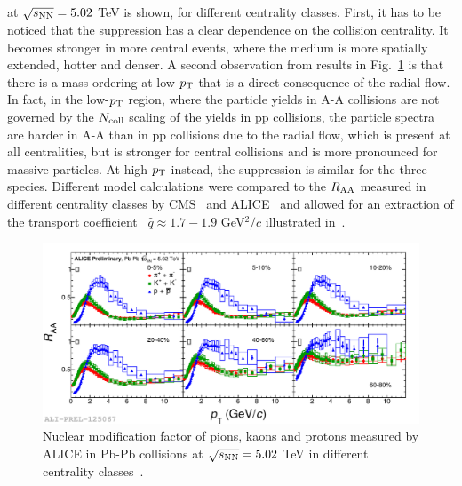  at $\sqrt{s_{\rm NN}} = 5.02$ TeV is shown, for different centrality classes. First, it 
 has to be noticed that the suppression has a clear dependence on the 
 collision centrality. It becomes stronger in more central events, 
 where the medium is more spatially extended, hotter and denser. 
 A second observation from 
  results in Fig.~\ref{fig:PiKPRaa5TeV} is that there is a mass ordering at 
  low $p_{\rm T}$ that is a direct consequence of the radial flow. In fact, in the low-$p_{\rm T}$
  region, where the particle yields in A-A collisions are not governed by the $N_{\rm coll}$ scaling 
  of the yields in pp collisions, the particle spectra are harder in A-A than in pp collisions due to the radial flow, which 
 is present at all centralities, but is stronger for central collisions and
  is more pronounced for massive particles.
  At high $p_{\rm T}$ instead, the suppression is similar for the three species. Different model calculations were compared to the $R_{\rm AA}$ 
    measured in different centrality classes by CMS~\cite{CMS:2012aa} 
    and ALICE~\cite{Abelev:2012hxa} and allowed for an extraction of 
    the transport coefficient~\cite{Baier:1996sk} $\hat{q} \approx 1.7-1.9$ 
    GeV$^2/c$ illustrated in~\cite{Burke:2013yra,Liu:2015vna}. 
\begin{figure}[!ht]
  \centering
  \includegraphics[width=15cm]{FigCap1/KPiPRAA5TeV.pdf}
  \caption{Nuclear modification factor of pions, kaons and protons measured by ALICE in Pb-Pb collisions at $\sqrt{s_{\rm NN}} = 5.02$ TeV in different centrality classes~\cite{Jacazio:2017dvy}.}
  \label{fig:PiKPRaa5TeV}
\end{figure}

